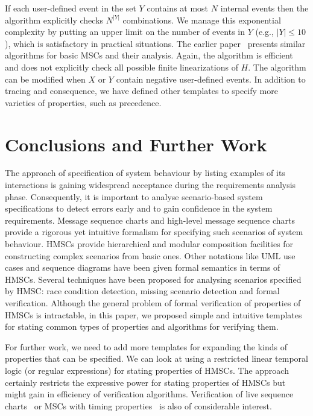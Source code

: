\documentclass{entcs}
\begin{document}
If each user-defined event in the set $Y$ contains at 
most $N$ internal events then the algorithm explicitly 
checks $N^{|Y|}$ combinations. We manage this exponential 
complexity by putting an upper limit on the number of 
events in $Y$ (e.g., $|Y| \leq 10$), which is satisfactory 
in practical situations. The earlier paper~\cite{BVP02} presents 
similar algorithms for basic MSCs and their analysis. 
Again, the algorithm is efficient and does not 
explicitly check all possible finite linearizations of 
$H$. The algorithm can be modified when $X$ or $Y$ contain 
negative user-defined events. In addition to tracing 
and consequence, we have defined other templates to 
specify more varieties of properties, such as precedence.

\section{Conclusions and Further Work}\label{con}

The approach of specification of system behaviour by 
listing examples of its interactions is gaining widespread 
acceptance during the requirements analysis phase. 
Consequently, it is important to analyse scenario-based 
system specifications to detect errors early and to gain 
confidence in the system requirements. Message sequence 
charts and high-level message sequence charts provide a 
rigorous yet intuitive formalism for specifying such 
scenarios of system behaviour. HMSCs provide hierarchical 
and modular composition facilities for constructing complex 
scenarios from basic ones. Other notations like UML use 
cases and sequence diagrams have been given formal 
semantics in terms of HMSCs. Several techniques have been 
proposed for analysing scenarios specified by HMSC: race 
condition detection, missing scenario detection and 
formal verification. Although the general problem of formal 
verification of properties of HMSCs is intractable, in this 
paper, we proposed simple and intuitive templates for 
stating common types of properties and algorithms for 
verifying them. 

For further work, we need to add more templates for 
expanding the kinds of properties that can be specified. 
We can look at using a restricted linear temporal logic 
(or regular expressions) for stating properties of HMSCs. 
The approach certainly restricts the expressive power for 
stating properties of HMSCs but might gain in efficiency 
of verification algorithms. Verification of live
sequence charts~\cite{DammHarel99} or MSCs with timing
properties~\cite{Silva98} is also of considerable interest.
\end{document}
